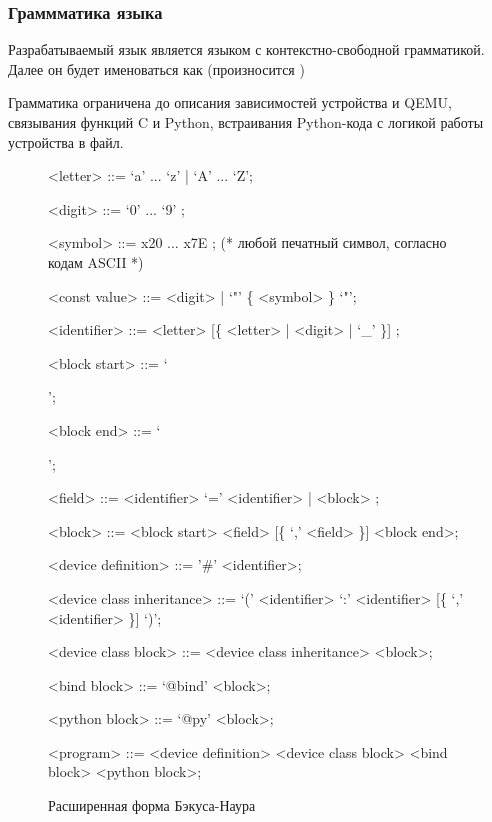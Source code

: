 \subsubsection{Граммматика языка}\label{sec:ch2/sec1/sub1/sub2}
Разрабатываемый язык является языком с контекстно-свободной грамматикой.
Далее он будет именоваться как {\mylanguage} (произносится \mylanguageprononciation)

Грамматика {\mylanguage} ограничена до описания зависимостей устройства и QEMU,
связывания функций C и Python, встраивания Python-кода с логикой работы устройства
в файл.


\setlength{\grammarparsep}{0.1cm}
\setlength{\grammarindent}{13em}
\begin{figure}[!htbp]
    \begin{grammar}
        <letter> ::= `a' ... `z' | `A' ... `Z';

        <digit> ::= `0' ... `9' ;

        <symbol> ::= x20 ... x7E ; (* любой печатный символ, согласно кодам ASCII *)

        <const value> ::= <digit> | `"' \{ <symbol> \} `"';

        <identifier> ::= <letter> [\{ <letter> | <digit> | `\_' \}] ;

        <block start> ::= `{';

        <block end> ::= `}';

        <field> ::= <identifier> `=' <identifier> | <block> ;

        <block> ::= <block start> <field> [\{ `,' <field> \}] <block end>;

        <device definition> ::= '\#' <identifier>;

        <device class inheritance> ::= `(' <identifier> `:' <identifier> [\{ `,' <identifier> \}] `)';

        <device class block> ::= <device class inheritance> <block>;

        <bind block> ::= `@bind' <block>;

        <python block> ::= `@py' <block>;

        <program> ::= <device definition> <device class block> <bind block> <python block>;
    \end{grammar}
    \caption{Расширенная форма Бэкуса-Наура \mylanguage}\label{fig:qpydev-grammar}
\end{figure}


